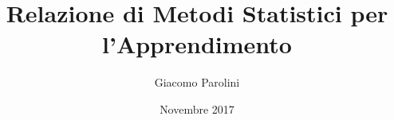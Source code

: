 \documentclass[12pt, letterpaper]{article}
\title{Relazione di Metodi Statistici per l'Apprendimento}
\author{Giacomo Parolini}
\date{Novembre 2017}
\begin{document}
\begin{titlepage}
\maketitle
\end{titlepage}

\tableofcontents
\pagebreak








\end{document}
